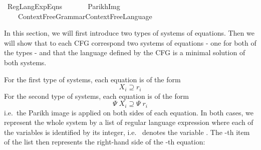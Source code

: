 %
\begin{isabellebody}%
%
%
\isadelimdocument
%
\endisadelimdocument
%
\isatagdocument
%
\isamarkuptrue%
%
\endisatagdocument
{\isafolddocument}%
%
\isadelimdocument
%
\endisadelimdocument
%
\isadelimtheory
%
\endisadelimtheory
%
\isatagtheory
{}\isamarkupfalse%
\ Reg{\isacharunderscore}{\kern0pt}Lang{\isacharunderscore}{\kern0pt}Exp{\isacharunderscore}{\kern0pt}Eqns\isanewline
\ \ \isanewline
\ \ \ \ {\isachardoublequoteopen}Parikh{\isacharunderscore}{\kern0pt}Img{\isachardoublequoteclose}\isanewline
\ \ \ \ {\isachardoublequoteopen}Context{\isacharunderscore}{\kern0pt}Free{\isacharunderscore}{\kern0pt}Grammar{\isachardot}{\kern0pt}Context{\isacharunderscore}{\kern0pt}Free{\isacharunderscore}{\kern0pt}Language{\isachardoublequoteclose}\isanewline
{}%
\endisatagtheory
{\isafoldtheory}%
%
\isadelimtheory
%
\endisadelimtheory
%
\begin{isamarkuptext}%
In this section, we will first introduce two types of systems of
equations. Then we will show that to each CFG correspond two systems of equations - one for both
of the types - and that the language defined by the CFG is a minimal solution of both systems.%
\end{isamarkuptext}\isamarkuptrue%
%
\isadelimdocument
%
\endisadelimdocument
%
\isatagdocument
%
\isamarkuptrue%
%
\endisatagdocument
{\isafolddocument}%
%
\isadelimdocument
%
\endisadelimdocument
%
\begin{isamarkuptext}%
For the first type of systems, each equation is of the form
\[X_i \supseteq r_i\]
For the second type of systems, each equation is of the form
\[\Psi \; X_i \supseteq \Psi \; r_i\]
i.e.\ the Parikh image is applied on both sides of each equation.
In both cases, we represent the whole system by a list of regular language expression where each
of the variables  is identified by its integer, i.e.\  denotes the variable
. The -th item of the list then represents the right-hand side  of the -th equation:%
\end{isamarkuptext}\isamarkuptrue%

\end{isabellebody}
